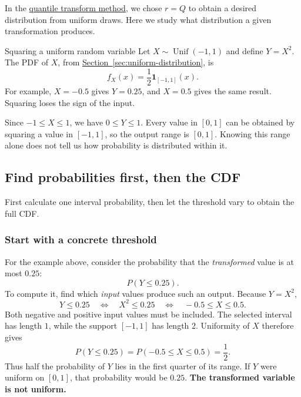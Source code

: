 \documentclass[a4paper,12pt,oneside]{report}
\begin{document}
In the \hyperref[sec:quantile-transform]{quantile transform method},
we chose $r=Q$ to obtain a desired distribution from uniform
draws. Here we study what distribution a given transformation
produces.

\begin{framedexample}{Squaring a uniform random variable}
\label{ex:square-uniform}
Let $X\sim\operatorname{Unif}(-1,1)$ and define $Y=X^2$.
The PDF of $X$, from
\hyperref[sec:uniform-distribution]{Section~\ref{sec:uniform-distribution}}, is
\[
  f_X(x)=\frac12\mathbf 1_{[-1,1]}(x).
\]
For example, $X=-0.5$ gives $Y=0.25$, and $X=0.5$ gives the
same result. Squaring loses the sign of the input.

Since $-1\leq X\leq1$, we have $0\leq Y\leq1$.
Every value in $[0,1]$ can be obtained by squaring a value in
$[-1,1]$, so the output range is $[0,1]$.
Knowing this range alone does not tell us how probability
is distributed within it.
\end{framedexample}

\clearpage
\subsection{Find probabilities first, then the CDF}
\label{sec:square-uniform-cdf}

First calculate one interval probability, then let the threshold
vary to obtain the full CDF.

\subsubsection{Start with a concrete threshold}
\label{sec:square-uniform-concrete-threshold}
For the example above, consider the probability that the
\emph{transformed} value is at most $0.25$:
\[
  P(Y\leq0.25).
\]
To compute it, find which \emph{input} values produce such an
output. Because $Y=X^2$,
\[
  Y\leq0.25
  \quad\Longleftrightarrow\quad
  X^2\leq0.25
  \quad\Longleftrightarrow\quad
  -0.5\leq X\leq0.5.
\]
Both negative and positive input values must be included.
The selected interval has length $1$, while the support
$[-1,1]$ has length $2$. Uniformity of $X$ therefore gives
\[
  P(Y\leq0.25)=P(-0.5\leq X\leq0.5)=\frac12.
\]
Thus half the probability of $Y$ lies in the first quarter
of its range. If $Y$ were uniform on $[0,1]$, that probability
would be $0.25$. \textbf{The transformed variable is not uniform.}
\end{document}
